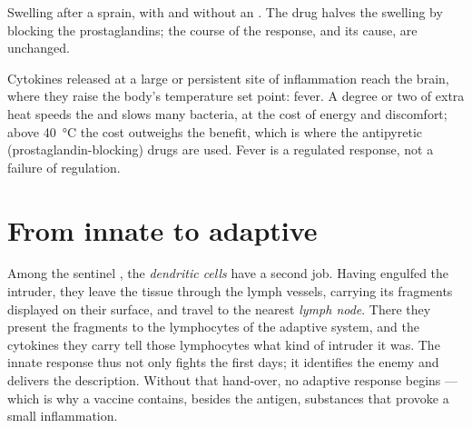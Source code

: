 \begin{omfigure}

{\small Swelling after a sprain, with and without an . The drug halves the swelling by blocking the prostaglandins; the
course of the response, and its cause, are unchanged.}
\end{omfigure}

\begin{example}[Fever]\label{ex:g12:innate-immunity:fever}
Cytokines released at a large or persistent site of inflammation reach
the brain, where they raise the body's temperature set point: fever.
A degree or two of extra heat speeds the  and slows many
bacteria, at the cost of energy and discomfort; above \qty{40}{\celsius}
the cost outweighs the benefit, which is where the antipyretic
(prostaglandin-blocking) drugs are used. Fever is a regulated
response, not a failure of regulation.
\end{example}

\section{From innate to adaptive}

\begin{proposition}\label{prop:g12:innate-immunity:handover}
Among the sentinel , the \emph{dendritic cells}
have a second job. Having engulfed the intruder, they leave the tissue
through the lymph vessels, carrying its  fragments displayed on
their surface, and travel to the nearest \emph{lymph node}. There
they present the fragments to the lymphocytes of the adaptive system,
and the cytokines they carry tell those lymphocytes what kind of
intruder it was. The innate response thus not only fights the first
days; it identifies the enemy and delivers the description. Without
that hand-over, no adaptive response begins --- which is why a vaccine
contains, besides the antigen, substances that provoke a small
inflammation.
\end{proposition}
\admitted

